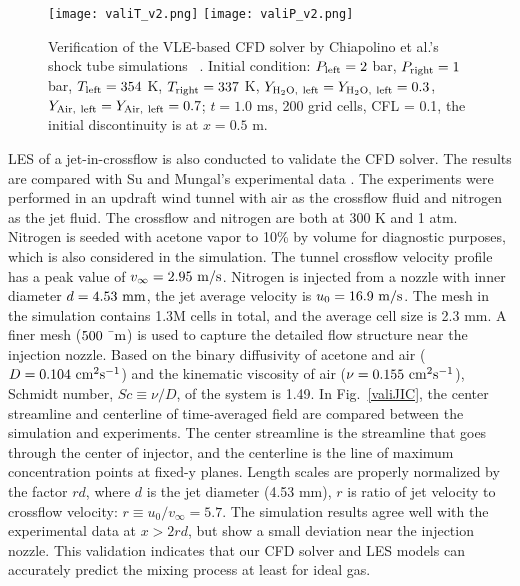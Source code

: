     
     \begin{figure}[htbp]

        \centering

            \texttt{[image: valiT\_v2.png]}
            \texttt{[image: valiP\_v2.png]}
        \caption{Verification of the VLE-based CFD solver by Chiapolino et al.'s shock tube simulations ~\cite{chiapolino2017simple}. Initial condition: $P_{\rm{left}} = 2$ bar, $P_{\rm{right}} = 1$ bar, $T_{\rm{left}} = 354$ K, $T_{\rm{right}} = 337$ K, $Y_{\rm{H_2O,\ left}} = Y_{\rm{H_2O,\ left}} = 0.3$, $Y_{\rm{Air,\ left}} = Y_{\rm{Air,\ left}} = 0.7$; $t = 1.0$ ms, 200 grid cells, CFL = 0.1, the initial discontinuity is at $x=0.5$ m.}
        \label{vali2ST}
    \end{figure}

    LES of a jet-in-crossflow is also conducted to validate the CFD solver. The results are compared with Su and Mungal's experimental data \cite{su2004simultaneous}. The experiments were performed in an updraft wind tunnel with air as the crossflow fluid and nitrogen as the jet fluid. The crossflow and nitrogen are both at 300 K and 1 atm. Nitrogen is seeded with acetone vapor to 10\% by volume for diagnostic purposes, which is also considered in the simulation. The tunnel crossflow velocity profile has a peak value of $v_{\infty}=2.95\ \rm{m/s}$. Nitrogen is injected from a nozzle with inner diameter $d=4.53\ \rm{mm}$, the jet average velocity is $u_0=16.9\ \rm{m/s}$. The mesh in the simulation contains 1.3M cells in total, and the average cell size is 2.3 mm. A finer mesh ($500\ \rm{\mu m}$) is used to capture the detailed flow structure near the injection nozzle. Based on the binary diffusivity of acetone and air ($D=0.104\ \rm{cm}^2\rm{s}^{-1}$) and the kinematic viscosity of air ($\nu=0.155\ \rm{cm}^2\rm{s}^{-1}$), Schmidt number, $Sc\equiv \nu/D$, of the system is 1.49. In Fig.~\ref{valiJIC}, the center streamline and  centerline of time-averaged field are compared between the simulation and experiments. The center streamline is the streamline that goes through the center of injector, and the  centerline is the line of maximum  concentration points at fixed-y planes. Length scales are properly normalized by the factor $rd$, where $d$ is the jet diameter (4.53 mm), $r$ is ratio of jet velocity to crossflow velocity: $r\equiv u_0/v_{\infty}=5.7$. The simulation results agree well with the experimental data at $x>2rd$, but show a small deviation near the injection nozzle.
    This validation indicates that our CFD solver and LES models can accurately predict the mixing process at least for ideal gas.

